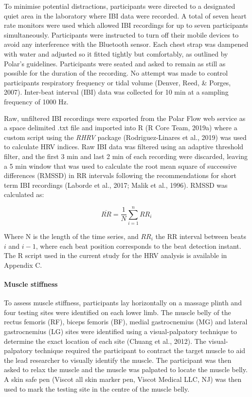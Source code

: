 \documentclass[man,floatsintext]{apa6}
\let\oldparagraph\paragraph
\renewcommand{\paragraph}[1]{\oldparagraph{#1}\mbox{}}
\begin{document}
To minimise potential distractions, participants were directed to a designated quiet area in the laboratory where IBI data were recorded.
A total of seven heart rate monitors were used which allowed IBI recordings for up to seven participants simultaneously.
Participants were instructed to turn off their mobile devices to avoid any interference with the Bluetooth sensor.
Each chest strap was dampened with water and adjusted so it fitted tightly but comfortably, as outlined by Polar's guidelines.
Participants were seated and asked to remain as still as possible for the duration of the recording.
No attempt was made to control participants respiratory frequency or tidal volume (Denver, Reed, \& Porges, 2007).
Inter-beat interval (IBI) data was collected for 10 min at a sampling frequency of 1000 Hz.

Raw, unfiltered IBI recordings were exported from the Polar Flow web service as a space delimited .txt file and imported into R (R Core Team, 2019a) where a custom script using the \emph{RHRV} package (Rodriguez-Linares et al., 2019) was used to calculate HRV indices.
Raw IBI data was filtered using an adaptive threshold filter, and the first 3 min and last 2 min of each recording were discarded, leaving a 5 min window that was used to calculate the root mean square of successive differences (RMSSD) in RR intervals following the recommendations for short term IBI recordings (Laborde et al., 2017; Malik et al., 1996). RMSSD was calculated as:

\begin{equation} 
  \overline{RR} = \frac{1}{N} \sum_{i=1}^{n} RR_i
  \label{eq:rmssd}
\end{equation}

Where N is the length of the time series, and \(RR_i\) the RR interval between beats \(i\) and \(i-1\), where each beat position corresponds to the beat detection instant.
The R script used in the current study for the HRV analysis is available in Appendix C.

\hypertarget{muscle-stiffness-1}{%
\paragraph{Muscle stiffness}\label{muscle-stiffness-1}}

To assess muscle stiffness, participants lay horizontally on a massage plinth and four testing sites were identified on each lower limb.
The muscle belly of the rectus femoris (RF), biceps femoris (BF), medial gastrocnemius (MG) and lateral gastrocnemius (LG) sites were identified using a visual-palpatory technique to determine the exact location of each site (Chuang et al., 2012).
The visual-palpatory technique required the participant to contract the target muscle to aid the lead researcher to visually identify the muscle.
The participant was then asked to relax the muscle and the muscle was palpated to locate the muscle belly.
A skin safe pen (Viscot all skin marker pen, Viscot Medical LLC, NJ) was then used to mark the testing site in the centre of the muscle belly.
\end{document}

